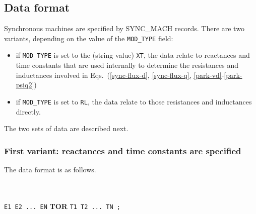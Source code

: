 \subsection{Data format}\label{format-sync}

Synchronous machines are specified by SYNC\_MACH records. There are two variants, depending on the value of the {\tt MOD\_TYPE} field:
\begin{itemize}
\item if {\tt MOD\_TYPE} is set to the (string value) {\tt XT}, the data relate to reactances and time constants that are used internally to determine the resistances and inductances involved in Eqs.~(\ref{sync-flux-d}, \ref{sync-flux-q}, \ref{park-vd}-\ref{park-psiq2})
\item if {\tt MOD\_TYPE} is set to {\tt RL}, the data relate to those resistances and inductances directly.
\end{itemize}

The two sets of data are described next.

\subsubsection*{First variant: reactances and time constants are specified}

The data format is as follows.

\hspace*{5ex}{\tt SYNC\_MACH NAME BUS FP FQ P Q SNOM PNOM H D IBRATIO} \\
\hspace*{10ex}{\tt MOD\_TYPE XL XD XPD XSD XQ XPQ XSQ M N RA TPD0 TSD0 TPQ0 TSQ0} \\
\hspace*{10ex}{\bf EXC} {\tt E1 E2 ...\ EN} \; {\bf TOR} {\tt T1 T2 ...\ TN ;}

